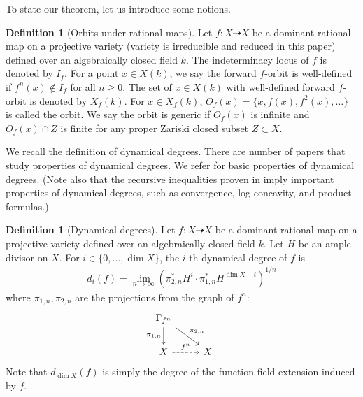 \documentclass[12pt]{amsart}
\theoremstyle{plain}
\theoremstyle{definition}
\newtheorem{definition}[theorem]{Definition}
\numberwithin{equation}{section}
\newcommand{\G}{\Gamma}
\begin{document}
To state our theorem, let us introduce some notions.

\begin{definition}[Orbits under rational maps]
Let $f \colon X \dashrightarrow X$ be a dominant rational map on a projective variety 
(variety is irreducible and reduced in this paper) defined over an algebraically closed field $k$.
The indeterminacy locus of $f$ is denoted by $I_{f}$.
For a point $x \in X(k)$, we say the forward $f$-orbit is well-defined if
$f^{n}(x) \not\in I_{f}$ for all $n \geq 0$.
The set of $x \in X(k)$ with well-defined forward $f$-orbit is denoted by $X_{f}(k)$.
For $x \in X_{f}(k)$, $O_{f}(x) = \{x, f(x),f^{2}(x),\dots\}$ is called the orbit.
We say the orbit is generic if $O_{f}(x)$ is infinite and $O_{f}(x) \cap Z$ is finite for 
any proper Zariski closed subset $Z \subset X$.
\end{definition}

We recall the definition of dynamical degrees.
There are number of papers that study properties of dynamical degrees.
We refer \cite{Tr20,Da20} for basic properties of dynamical degrees.
(Note also that the recursive inequalities proven in \cite{xie2024algebraic}
imply important properties of dynamical degrees, such as convergence, log concavity, and product formulas.)

\begin{definition}[Dynamical degrees]
Let $f \colon X \dashrightarrow X$ be a dominant rational map on a projective variety 
defined over an algebraically closed field $k$.
Let $H$ be an ample divisor on $X$.
For $i \in \{0,\dots, \dim X\}$, the $i$-th dynamical degree of $f$ is 
\begin{align}
d_{i}(f) = \lim_{n \to \infty} ( \pi_{2,n}^{*}H^{i} \cdot  \pi_{1,n}^{*}H^{\dim X - i} )^{1/n}
\end{align}
where $\pi_{1,n}, \pi_{2,n}$ are the projections from the graph of $f^{n}$:
\begin{equation}
\begin{tikzcd}
\G_{f^{n}} \arrow[d,"\pi_{1,n}",swap] \arrow[rd, "\pi_{2,n}"] & \\
X \arrow[r, "f^{n}", dashed]& X.
\end{tikzcd}
\end{equation}
Note that $d_{\dim X}(f)$ is simply the degree of the function field extension induced by $f$.
\end{definition}
\end{document}
